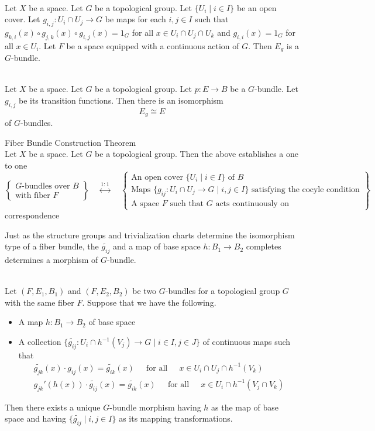 \documentclass[a4paper]{article}
\begin{document}
\begin{lmm}{}{}\\
Let $X$ be a space. Let $G$ be a topological group. Let $\{U_i\;|\;i\in I\}$ be an open cover. Let $g_{i,j}:U_i\cap U_j\to G$ be maps for each $i,j\in I$ such that $g_{k,i}(x)\circ g_{j,k}(x)\circ g_{i,j}(x)=1_G$ for all $x\in U_i\cap U_j\cap U_k$ and $g_{i,i}(x)=1_G$ for all $x\in U_i$. Let $F$ be a space equipped with a continuous action of $G$. Then $E_g$ is a $G$-bundle. 
\end{lmm}

\begin{lmm}{}{}\\
Let $X$ be a space. Let $G$ be a topological group. Let $p:E\to B$ be a $G$-bundle. Let $g_{i,j}$ be its transition functions. Then there is an isomorphism $$E_g\cong E$$ of $G$-bundles. 
\end{lmm}

\begin{thm}{Fiber Bundle Construction Theorem}{}\\
Let $X$ be a space. Let $G$ be a topological group. Then the above establishes a one to one $$\left\{\substack{G\text{-bundles over }B\\\text{with fiber }F}\right\}\;\;\;\;\overset{1:1}{\longleftrightarrow}\;\;\;\;\left\{\substack{\text{An open cover }\{U_i\;|\;i\in I\}\text{ of }B\\\text{Maps }\{g_{ij}:U_i\cap U_j\to G\;|\;i,j\in I\}\text{ satisfying the cocyle condition}\\\text{A space }F\text{ such that }G\text{ acts continuously on}}\right\}$$ correspondence 
\end{thm}

Just as the structure groups and trivialization charts determine the isomorphism type of a fiber bundle, the $\widetilde{g_{ij}}$ and a map of base space $h:B_1\to B_2$ completes determines a morphism of $G$-bundle. 

\begin{thm}{}{}\\
Let $(F,E_1,B_1)$ and $(F,E_2,B_2)$ be two $G$-bundles for a topological group $G$ with the same fiber $F$. Suppose that we have the following. 
\begin{itemize}
\item A map $h:B_1\to B_2$ of base space
\item A collection $\{\widetilde{g_{ij}}:U_i\cap h^{-1}(V_j)\to G\;|\;i\in I,j\in J\}$ of continuous maps such that \begin{gather*}
\widetilde{g_{jk}}(x)\cdot g_{ij}(x)=\widetilde{g_{ik}}(x)\;\;\;\;\text{ for all }\;\;\;\;x\in U_i\cap U_j\cap h^{-1}(V_k)\\
g_{jk}'(h(x))\cdot\widetilde{g_{ij}}(x)=\widetilde{g_{ik}}(x)\;\;\;\;\text{ for all }\;\;\;\;x\in U_i\cap h^{-1}(V_j\cap V_k)
\end{gather*}
\end{itemize}
Then there exists a unique $G$-bundle morphism having $h$ as the map of base space and having $\{\widetilde{g_{ij}}\;|\;i,j\in I\}$ as its mapping transformations. 
\end{thm}
\end{document}
